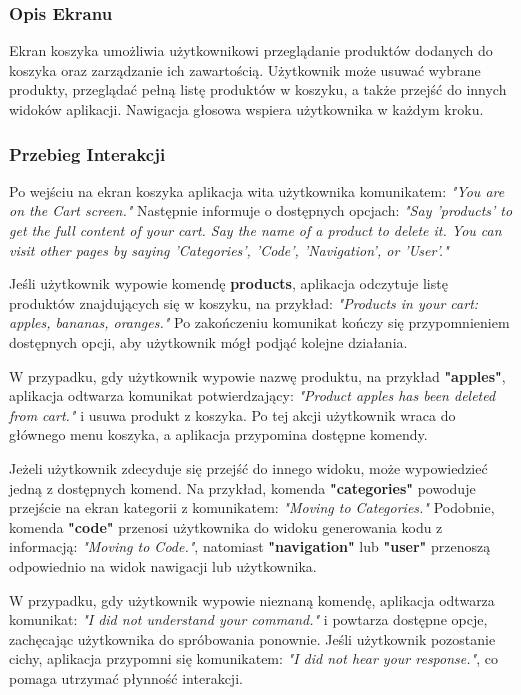 \subsubsection{Opis Ekranu}
Ekran koszyka umożliwia użytkownikowi przeglądanie produktów dodanych do koszyka oraz zarządzanie ich zawartością. Użytkownik może usuwać wybrane produkty, przeglądać pełną listę produktów w koszyku, a także przejść do innych widoków aplikacji. Nawigacja głosowa wspiera użytkownika w każdym kroku.

\subsubsection{Przebieg Interakcji}
Po wejściu na ekran koszyka aplikacja wita użytkownika komunikatem: \textit{"You are on the Cart screen."} Następnie informuje o dostępnych opcjach: \textit{"Say 'products' to get the full content of your cart. Say the name of a product to delete it. You can visit other pages by saying 'Categories', 'Code', 'Navigation', or 'User'."}

Jeśli użytkownik wypowie komendę \textbf{products}, aplikacja odczytuje listę produktów znajdujących się w koszyku, na przykład: \textit{"Products in your cart: apples, bananas, oranges."} Po zakończeniu komunikat kończy się przypomnieniem dostępnych opcji, aby użytkownik mógł podjąć kolejne działania.

W przypadku, gdy użytkownik wypowie nazwę produktu, na przykład \textbf{"apples"}, aplikacja odtwarza komunikat potwierdzający: \textit{"Product apples has been deleted from cart."} i usuwa produkt z koszyka. Po tej akcji użytkownik wraca do głównego menu koszyka, a aplikacja przypomina dostępne komendy.

Jeżeli użytkownik zdecyduje się przejść do innego widoku, może wypowiedzieć jedną z dostępnych komend. Na przykład, komenda \textbf{"categories"} powoduje przejście na ekran kategorii z komunikatem: \textit{"Moving to Categories."} Podobnie, komenda \textbf{"code"} przenosi użytkownika do widoku generowania kodu z informacją: \textit{"Moving to Code."}, natomiast \textbf{"navigation"} lub \textbf{"user"} przenoszą odpowiednio na widok nawigacji lub użytkownika.

W przypadku, gdy użytkownik wypowie nieznaną komendę, aplikacja odtwarza komunikat: \textit{"I did not understand your command."} i powtarza dostępne opcje, zachęcając użytkownika do spróbowania ponownie. Jeśli użytkownik pozostanie cichy, aplikacja przypomni się komunikatem: \textit{"I did not hear your response."}, co pomaga utrzymać płynność interakcji.

